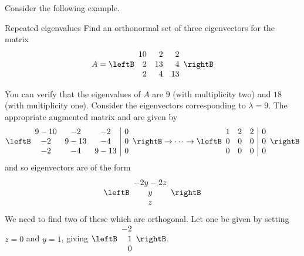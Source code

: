 Consider the following example.

\begin{example}{Repeated eigenvalues}{}
Find an orthonormal set of three eigenvectors for the matrix
\begin{equation*}
A = \leftB
\begin{array}{rrr}
10 & 2 & 2 \\
2 & 13 & 4 \\
2 & 4 & 13
\end{array}
\rightB
\end{equation*}
\end{example}

\begin{solution}
You can verify that the eigenvalues of $A$ are $9$ (with multiplicity two) and $18$ (with multiplicity one). Consider the
eigenvectors corresponding to $\lambda =9$. The appropriate augmented matrix
and {\rref} are given by  
\begin{equation*}
\leftB
\begin{array}{ccc|c}
9-10 & -2 & -2 & 0 \\ 
-2 & 9-13 & -4 & 0 \\ 
-2 & -4 & 9-13 & 0
\end{array}
\rightB
\rightarrow \cdots \rightarrow 
\leftB
\begin{array}{rrr|r}
1 & 2 & 2 & 0 \\ 
0 & 0 & 0 & 0 \\ 
0 & 0 & 0 & 0
\end{array}
\rightB
\end{equation*}
and so eigenvectors are of the form 
\begin{equation*}
\leftB
\begin{array}{c}
-2y-2z \\ 
y \\ 
z
\end{array}
\rightB
\end{equation*}
We need to find two of these which are orthogonal. Let one be given by setting $z=0$ and $y=1$, giving $
\leftB
\begin{array}{r}
-2 \\ 
1 \\ 
0
\end{array}
\rightB$. 


\end{solution}
